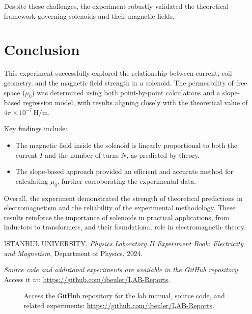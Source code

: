 \documentclass[journal]{IEEEtran}
\begin{document}
    Despite these challenges, the experiment robustly validated the theoretical framework governing solenoids and their magnetic fields.
    
    \section{Conclusion}
    This experiment successfully explored the relationship between current, coil geometry, and the magnetic field strength in a solenoid. The permeability of free space (\( \mu_0 \)) was determined using both point-by-point calculations and a slope-based regression model, with results aligning closely with the theoretical value of \( 4\pi \times 10^{-7} \, \mathrm{H/m} \). 
    
    Key findings include:
    \begin{itemize}
        \item The magnetic field inside the solenoid is linearly proportional to both the current \( I \) and the number of turns \( N \), as predicted by theory.
        \item The slope-based approach provided an efficient and accurate method for calculating \( \mu_0 \), further corroborating the experimental data.
    \end{itemize}
    
    Overall, the experiment demonstrated the strength of theoretical predictions in electromagnetism and the reliability of the experimental methodology. These results reinforce the importance of solenoids in practical applications, from inductors to transformers, and their foundational role in electromagnetic theory.
    
    \begin{thebibliography}{9}
            ISTANBUL UNIVERSITY, 
            \textit{Physics Laboratory II Experiment Book: Electricity and Magnetism}, 
            Department of Physics, 2024.
        
            \textit{Source code and additional experiments are available in the GitHub repository.} \\ 
            Access it at: \url{https://github.com/ibeuler/LAB-Reports}.
        
        \end{thebibliography}
        
        \begin{figure}[H]
            \centering
            \begin{minipage}{0.15\textwidth}
                \centering
            \end{minipage}%
            \begin{minipage}{0.2\textwidth}
                \raggedright
                \caption{Access the GitHub repository for the lab manual, source code, and related experiments: \href{https://github.com/ibeuler/LAB-Reports}{\url{https://github.com/ibeuler/LAB-Reports}}.}
                \label{fig:qr}
            \end{minipage}
        \end{figure}
        
\end{document}
